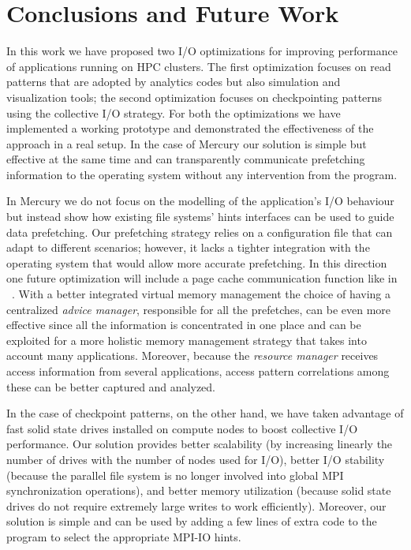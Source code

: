 \chapter{Conclusions and Future Work} \label{chapt: conclusion}
In this work we have proposed two I/O optimizations for improving performance of applications running on HPC clusters. The first optimization focuses on read patterns that are 
adopted by analytics codes but also simulation and visualization tools; the second optimization focuses on checkpointing patterns using the collective I/O strategy. For both the 
optimizations we have implemented a working prototype and demonstrated the effectiveness of the approach in a real setup. In the case of Mercury our solution is simple but effective 
at the same time and can transparently communicate prefetching information to the operating system without any intervention from the program. 

In Mercury we do not focus on the modelling of the application's I/O behaviour but instead show how existing file systems' hints interfaces can be used to guide data prefetching. 
Our prefetching strategy relies on a configuration file that can adapt to different scenarios; however, it lacks a tighter integration with the operating system that would allow 
more accurate prefetching. In this direction one future optimization will include a page cache communication function like in ~\cite{VanDeBogartFK09}. 
With a better integrated virtual memory management the choice of having a centralized \textit{advice manager}, responsible for all the prefetches, can be even more effective since all 
the information is concentrated in one place and can be exploited for a more holistic memory management strategy that takes into account many applications. Moreover, because 
the \textit{resource manager} receives access information from several applications, access pattern correlations among these can be better captured and analyzed.

In the case of checkpoint patterns, on the other hand, we have taken advantage of fast solid state drives installed on compute nodes to boost collective I/O performance. Our solution
provides better scalability (by increasing linearly the number of drives with the number of nodes used for I/O), better I/O stability (because the parallel file system is no
longer involved into global MPI synchronization operations), and better memory utilization (because solid state drives do not require extremely large writes to work efficiently).
Moreover, our solution is simple and can be used by adding a few lines of extra code to the program to select the appropriate MPI-IO hints. 

